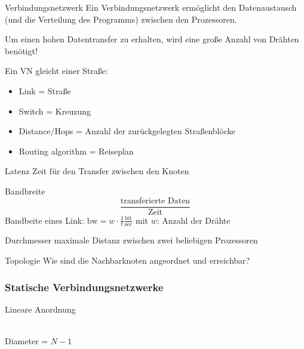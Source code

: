 \begin{defi}{Verbindungsnetzwerk}
    Ein Verbindungsnetzwerk ermöglicht den Datenaustausch (und die Verteilung des Programms) zwischen den Prozessoren.
    
    Um einen hohen Datentransfer zu erhalten, 
    wird eine große Anzahl von Drähten benötigt!
    
    Ein VN gleicht einer Straße:
    \begin{itemize}
        \item Link = Straße
        \item Switch = Kreuzung
        \item Distance/Hops = Anzahl der zurückgelegten Straßenblöcke
        \item Routing algorithm = Reiseplan
    \end{itemize}
    
\end{defi}

\begin{defi}[Verbindungsnetzwerk]{Latenz}
    Zeit für den Transfer zwischen den Knoten
\end{defi}

\begin{defi}[Verbindungsnetzwerk]{Bandbreite}
    \[\frac{\text{transferierte Daten}}{\text{Zeit}}\]
    Bandbeite eines Link: $\text{bw} = w \cdot \frac{1}{t}\frac{\text{bit}}{\text{sec}}$
    mit $w$: Anzahl der Drähte
\end{defi}

\begin{defi}[Verbindungsnetzwerk]{Durchmesser}
    maximale Distanz zwischen zwei beliebigen Prozessoren
\end{defi}

\begin{defi}[Verbindungsnetzwerk]{Topologie}
    Wie sind die Nachbarknoten angeordnet und erreichbar?
\end{defi}

\subsubsection{Statische Verbindungsnetzwerke}

\begin{defi}{Lineare Anordnung}
    \begin{center}
        \\
        Diameter = $N-1$
    \end{center}
\end{defi}

